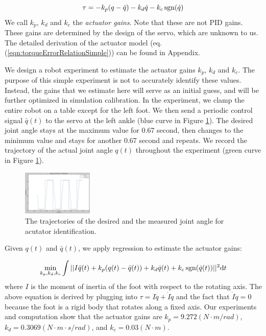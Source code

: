 \begin{equation}
  \tau = -k_p(q-\bar{q}) - k_d\dot{q} - k_c\operatorname{sgn}(\dot{q})\\
    \label{eqn:torqueErrorRelationSimple}
\end{equation}
We call $k_p$, $k_d$ and $k_c$ the \emph{actuator gains}. Note that these are not PID gains. These gains are determined by the design of the servo, which are unknown to us. The detailed derivation of the actuator model (eq. (\ref{eqn:torqueErrorRelationSimple})) can be found in Appendix.

We design a robot experiment to estimate the actuator gains $k_p$, $k_d$ and $k_c$. The purpose of this simple experiment is not to accurately identify these values. Instead, the gains that we estimate here will serve as an initial guess, and will be further optimized in simulation calibration. In the experiment, we clamp the entire robot on a table except for the left foot. We then send a periodic control signal $\bar{q}(t)$ to the servo at the left ankle (blue curve in Figure \ref{fig:actuatorId}). The desired joint angle stays at the maximum value for 0.67 second, then changes to the minimum value and stays for another 0.67 second and repeats. We record the trajectory of the actual joint angle $q(t)$ throughout the experiment (green curve in Figure \ref{fig:actuatorId}). 

\begin{figure}[!t]
  \centering
  \includegraphics[width=0.3\textwidth]{figures/actuatorId}
  \caption{The trajectories of the desired and the measured joint angle for acutator identification.}
  \vspace{-0.1in}
  \label{fig:actuatorId}
\end{figure}

Given $q(t)$ and $\bar{q}(t)$, we apply regression to estimate the actuator gains:

\begin{displaymath}
\min_{k_p, k_d, k_c}\int||I\ddot{q}(t)+k_p(q(t)-\bar{q}(t)) + k_d\dot{q}(t) + k_c\operatorname{sgn}(\dot{q}(t))||^2\mathrm{d}t
\end{displaymath}
where $I$ is the moment of inertia of the foot with respect to the rotating axis. The above equation is derived by plugging into $\tau = I\ddot{q}+\dot{I}\dot{q}$ and the fact that $\dot{I}\dot{q}=0$ because the foot is a rigid body that rotates along a fixed axis. Our experiments and computation show that the actuator gains are $k_p=9.272(N\cdot m/rad)$, $k_d=0.3069(N\cdot m\cdot s/rad)$, and $k_c=0.03(N\cdot m)$. 


